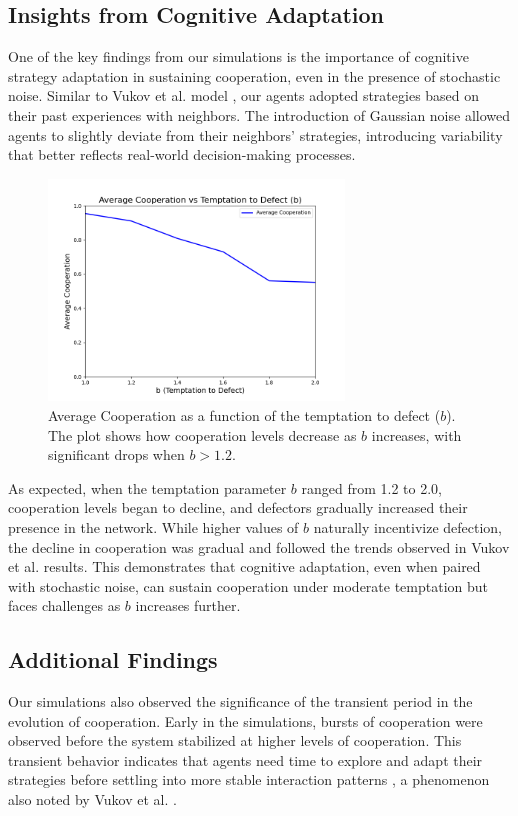 \documentclass[runningheads]{llncs}
\begin{document}
\subsection{Insights from Cognitive Adaptation}
One of the key findings from our simulations is the importance of cognitive strategy adaptation in sustaining cooperation, even in the presence of stochastic noise. Similar to Vukov et al. model \cite{vukov}, our agents adopted strategies based on their past experiences with neighbors. The introduction of Gaussian noise allowed agents to slightly deviate from their neighbors' strategies, introducing variability that better reflects real-world decision-making processes.

\begin{figure}[H]
    \centering
    \includegraphics[width=0.7\textwidth]{cooperation_vs_b.png}
    \caption{Average Cooperation as a function of the temptation to defect (\( b \)). The plot shows how cooperation
    levels decrease as \( b \) increases, with significant drops when \( b > 1.2 \).}
    \label{fig:coop_vs_b}
\end{figure}

As expected, when the temptation parameter \( b \) ranged from 1.2 to 2.0, cooperation levels began to decline,
and defectors gradually increased their presence in the network.
While higher values of \( b \) naturally incentivize defection, the decline in
cooperation was gradual and followed the trends observed in Vukov et al. \cite{vukov}
results. This demonstrates that cognitive adaptation, even when paired
with stochastic noise, can sustain cooperation under moderate temptation but
faces challenges as \( b \) increases further.

\subsection{Additional Findings}
Our simulations also observed the significance of the transient period in the evolution
of cooperation. Early in the simulations, bursts of cooperation were observed
before the system stabilized at higher levels of cooperation.
This transient behavior indicates that agents need time to explore and
adapt their strategies before settling into more stable interaction patterns
, a phenomenon also noted by Vukov et al. \cite{vukov}.
\end{document}
